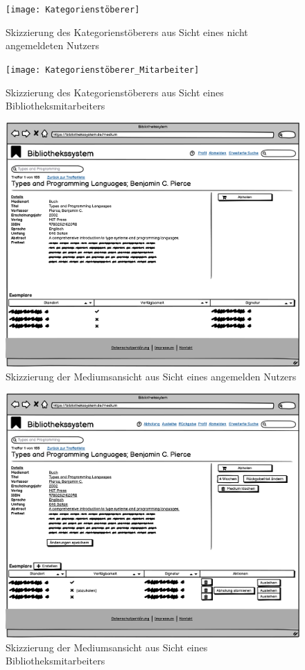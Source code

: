 \documentclass{article}
\begin{document}
\begin{figure}[h]
    \centering
    \texttt{[image: Kategorienstöberer]}
    \caption{Skizzierung des Kategorienstöberers aus Sicht eines nicht angemeldeten Nutzers}
    \label{katstoeb}
\end{figure}

\begin{figure}[h]
    \centering
    \texttt{[image: Kategorienstöberer\_Mitarbeiter]}
    \caption{Skizzierung des Kategorienstöberers aus Sicht eines Bibliotheksmitarbeiters}
    \label{katstoebmit}
\end{figure}

\begin{figure}[h]
    \centering
    \includegraphics[width = 40em]{Mediumsansicht}
    \caption{Skizzierung der Mediumsansicht aus Sicht eines angemelden Nutzers}
    \label{mediumsansicht}
\end{figure}

\begin{figure}[h]
    \centering
    \includegraphics[width = 40em]{Mediumsansicht_Mitarbeiter}
    \caption{Skizzierung der Mediumsansicht aus Sicht eines Bibliotheksmitarbeiters}
    \label{mediumsansichtmit}
\end{figure}
\end{document}
